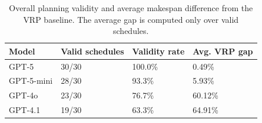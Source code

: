 \begin{table}[htbp]
\centering
\caption[Overall planning validity and average makespan difference from the VRP baseline.]
{Overall planning validity and average makespan difference from the VRP baseline. The average gap is computed only over valid schedules.}
\label{tab:planning_validity_summary}
\centering
\begin{tabular}{llll}
\toprule
Model & Valid schedules & Validity rate & Avg. VRP gap \\
\midrule
GPT-5 & 30/30 & 100.0\% & 0.49\% \\
GPT-5-mini & 28/30 & 93.3\% & 5.93\% \\
GPT-4o & 23/30 & 76.7\% & 60.12\% \\
GPT-4.1 & 19/30 & 63.3\% & 64.91\% \\
\bottomrule
\end{tabular}

\end{table}